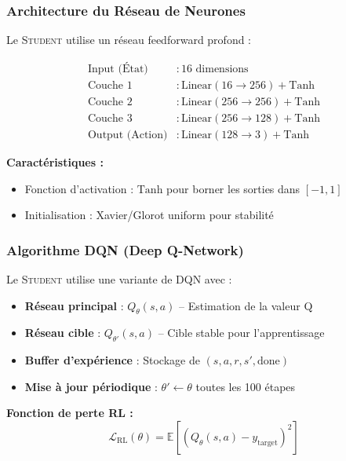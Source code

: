 \documentclass[12pt,a4paper]{article}
\newcommand{\student}{\textsc{Student}}
\newcommand{\rl}{\textsc{RL}}
\begin{document}
\subsubsection{Architecture du Réseau de Neurones}

Le \student{} utilise un réseau feedforward profond :

\begin{align}
\text{Input (État)} &: 16 \text{ dimensions} \\
\text{Couche 1} &: \text{Linear}(16 \to 256) + \text{Tanh} \\
\text{Couche 2} &: \text{Linear}(256 \to 256) + \text{Tanh} \\
\text{Couche 3} &: \text{Linear}(256 \to 128) + \text{Tanh} \\
\text{Output (Action)} &: \text{Linear}(128 \to 3) + \text{Tanh}
\end{align}

\textbf{Caractéristiques :}
\begin{itemize}
    \item Fonction d'activation : $\text{Tanh}$ pour borner les sorties dans $[-1, 1]$
    \item Initialisation : Xavier/Glorot uniform pour stabilité
\end{itemize}

\subsubsection{Algorithme DQN (Deep Q-Network)}

Le \student{} utilise une variante de DQN avec :
\begin{itemize}
    \item \textbf{Réseau principal} : $Q_\theta(s, a)$ -- Estimation de la valeur Q
    \item \textbf{Réseau cible} : $Q_{\theta'}(s, a)$ -- Cible stable pour l'apprentissage
    \item \textbf{Buffer d'expérience} : Stockage de $(s, a, r, s', \text{done})$
    \item \textbf{Mise à jour périodique} : $\theta' \leftarrow \theta$ toutes les 100 étapes
\end{itemize}

\textbf{Fonction de perte \rl{} :}
\begin{equation}
\mathcal{L}_{\text{RL}}(\theta) = \mathbb{E}\left[(Q_\theta(s, a) - y_{\text{target}})^2\right]
\end{equation}
\end{document}
